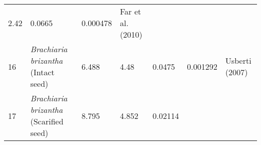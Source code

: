 \documentclass[]{article}
\begin{document}
\begin{longtable}[]{@{}lllllll@{}}
\begin{minipage}[t]{0.08\columnwidth}
2.42\strut
\end{minipage} & \begin{minipage}[t]{0.08\columnwidth}\raggedright
0.0665\strut
\end{minipage} & \begin{minipage}[t]{0.08\columnwidth}\raggedright
0.000478\strut
\end{minipage} & \begin{minipage}[t]{0.23\columnwidth}\raggedright
Far et al. (2010)\strut
\end{minipage}\tabularnewline
\begin{minipage}[t]{0.05\columnwidth}\raggedright
16\strut
\end{minipage} & \begin{minipage}[t]{0.23\columnwidth}\raggedright
\emph{Brachiaria brizantha }(Intact seed)\strut
\end{minipage} & \begin{minipage}[t]{0.05\columnwidth}\raggedright
6.488\strut
\end{minipage} & \begin{minipage}[t]{0.08\columnwidth}\raggedright
4.48\strut
\end{minipage} & \begin{minipage}[t]{0.08\columnwidth}\raggedright
0.0475\strut
\end{minipage} & \begin{minipage}[t]{0.08\columnwidth}\raggedright
0.001292\strut
\end{minipage} & \begin{minipage}[t]{0.23\columnwidth}\raggedright
Usberti (2007)\strut
\end{minipage}\tabularnewline
\begin{minipage}[t]{0.05\columnwidth}\raggedright
17\strut
\end{minipage} & \begin{minipage}[t]{0.23\columnwidth}\raggedright
\emph{Brachiaria brizantha }(Scarified seed)\strut
\end{minipage} & \begin{minipage}[t]{0.05\columnwidth}\raggedright
8.795\strut
\end{minipage} & \begin{minipage}[t]{0.08\columnwidth}\raggedright
4.852\strut
\end{minipage} & \begin{minipage}[t]{0.08\columnwidth}\raggedright
0.02114\strut
\end{minipage} & \begin{minipage}[t]{0.08\columnwidth}\raggedright

\end{minipage}
\end{longtable}
\end{document}
